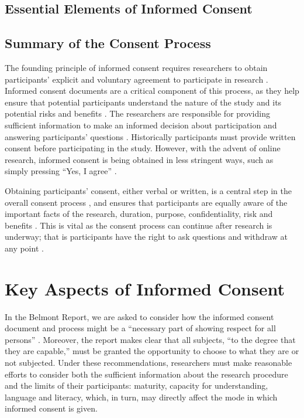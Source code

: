 \documentclass[
  11pt,
]{book}
\begin{document}
\subsection{Essential Elements of Informed Consent}\label{essential-elements-of-informed-consent}

\subsection{Summary of the Consent Process}\label{summary-of-the-consent-process}

The founding principle of informed consent requires researchers to obtain participants' explicit and voluntary agreement to participate in research \citep{american_psychological_association_ethical_2017}. Informed consent documents are a critical component of this process, as they help ensure that potential participants understand the nature of the study and its potential risks and benefits \citep[Section 3.10]{american_psychological_association_ethical_2017}. The researchers are responsible for providing sufficient information to make an informed decision about participation and answering participants' questions \citep[Section 3.10 (a)]{american_psychological_association_ethical_2017}. Historically participants must provide written consent before participating in the study. However, with the advent of online research, informed consent is being obtained in less stringent ways, such as simply pressing ``Yes, I agree'' \citep{rothwell_informed_2021}.

Obtaining participants' consent, either verbal or written, is a central step in the overall consent process \citep{roache_why_2014}, and ensures that participants are equally aware of the important facts of the research, duration, purpose, confidentiality, risk and benefits \citep[Section 3.10, 2017]{american_psychological_association_ethical_2017}. This is vital as the consent process can continue after research is underway; that is participants have the right to ask questions and withdraw at any point \citep[Section 3.10]{american_psychological_association_ethical_2017}.

\section{Key Aspects of Informed Consent}\label{key-aspects-of-informed-consent}

In the Belmont Report, we are asked to consider how the informed consent document and process might be a ``necessary part of showing respect for all persons'' \citep[Part C]{national_commission_for_the_protection_of_human_subjects_of_biomedical_and_behavioral_research_belmont_1979}. Moreover, the report makes clear that all subjects, ``to the degree that they are capable,'' must be granted the opportunity to choose to what they are or not subjected. Under these recommendations, researchers must make reasonable efforts to consider both the sufficient information about the research procedure and the limits of their participants: maturity, capacity for understanding, language and literacy, which, in turn, may directly affect the mode in which informed consent is given.
\end{document}
